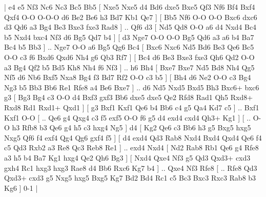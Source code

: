 \makegametitle 
|   e4   e5    Nf3   Nc6    Nc3   Bc5    Bb5 [  Nxe5 Nxe5  d4 Bd6  dxe5 Bxe5  Qf3 Nf6  Bf4 Bxf4  Qxf4 O-O  O-O-O d6  Be2 Be6  h3 Bd7  Kb1 Qe7   ]  [  Bb5 Nf6  O-O O-O  Bxc6 dxc6  d3 Qd6  a3 Bg4  Be3 Bxe3  fxe3 Rad8   ] .. Qf6    d3 [  Nd5 Qd8  O-O a6  d4 Nxd4  Bc4 b5  Nxd4 bxc4  Nf3 d6  Bg5 Qd7  b4   ]  [  d3 Nge7  O-O O-O  Bg5 Qd6  a3 a6  b4 Ba7  Bc4 b5  Bb3   ] .. Nge7    O-O   a6    Bg5   Qg6    Bc4 [  Bxc6 Nxc6  Nd5 Bd6  Be3 Qe6  Bc5 O-O  c3 f6  Bxd6 Qxd6  Nh4 g6  Qb3 Rf7   ]  [  Bc4 d6  Be3 Bxe3  fxe3 Qh6  Qd2 O-O  a3 Bg4  Qf2 b5  Bd5 Kh8  Nh4 f6  Nf3   ] .. h6    Bh4 [  Bxe7 Bxe7  Nd5 Bd8  Nh4 Qg5  Nf5 d6  Nb6 Bxf5  Nxa8 Bg4  f3 Bd7  Rf2 O-O  c3 b5   ]  [  Bh4 d6  Ne2 O-O  c3 Bg4  Ng3 b5  Bb3 Bb6  Re1 Rfe8  a4 Be6  Bxe7   ] .. d6    Nd5   Nxd5    Bxd5   Bh3    Bxc6+   bxc6    g3 [  Bg3 Bg4  c3 O-O  d4 Bxf3  gxf3 Bb6  dxe5 dxe5  Qe2 Rfd8  Rad1 Qh5  Rxd8+ Rxd8  Rd1 Rxd1+  Qxd1   ]  [  g3 Bxf1  Kxf1 Qe6  b4 Bb6  c4 g5  Qa4 Kd7  c5   ] .. Bxf1    Kxf1   O-O [ .. Qe6  g4 Qxg4  c3 f5  exf5 O-O  f6 g5  d4 exd4  cxd4 Qh3+  Kg1   ]  [ .. O-O  h3 Rfb8  b3 Qe6  g4 h5  c3 hxg4  Ng5   ]  d4 [  Kg2 Qe6  c3 Bb6  h3 g5  Bxg5 hxg5  Nxg5 Qf6  f4 exf4  Qg4 Qg6  gxf4 f5   ]  [  d4 exd4  Qd3 Rab8  Nxd4 Bxd4  Qxd4 Qe6  f4 c5  Qd3 Rxb2  a3 Re8  Qc3 Reb8  Re1   ] .. exd4    Nxd4 [  Nd2 Rab8  Rb1 Qe6  g4 Rfe8  a3 h5  b4 Ba7  Kg1 hxg4  Qe2 Qh6  Bg3   ]  [  Nxd4 Qxe4  Nf3 g5  Qd3 Qxd3+  cxd3 gxh4  Rc1 hxg3  hxg3 Rae8  d4 Bb6  Rxc6 Kg7  b4   ] .. Qxe4    Nf3   Rfe8    [ .. Rfe8  Qd3 Qxd3+  cxd3 g5  Nxg5 hxg5  Bxg5 Kg7  Bd2 Bd4  Rc1 c5  Bc3 Bxc3  Rxc3 Rab8  b3 Kg6   ] 0-1  |
